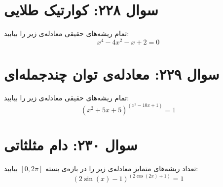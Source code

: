 \documentclass[12pt]{article}
\begin{document}
\vspace{1cm}
\hrulefill
\vspace{1cm}

\section*{سوال ۲۲۸: کوارتیک طلایی}
تمام ریشه‌های حقیقی معادله‌ی زیر را بیابید:
\begin{displaymath}
	x^4 - 4x^2 - x + 2 = 0
\end{displaymath}

\vspace{1cm}
\hrulefill
\vspace{1cm}

\section*{سوال ۲۲۹: معادله‌ی توان چندجمله‌ای}
تمام ریشه‌های حقیقی معادله‌ی زیر را بیابید:
\begin{displaymath}
	(x^2+5x+5)^{(x^2-10x+1)} = 1
\end{displaymath}

\vspace{1cm}
\hrulefill
\vspace{1cm}

\section*{سوال ۲۳۰: دام مثلثاتی}
تعداد ریشه‌های متمایز معادله‌ی زیر را در بازه‌ی بسته \( [0, 2\pi] \) بیابید:
\begin{displaymath}
	(2\sin(x) - 1)^{(2\cos(2x) + 1)} = 1
\end{displaymath}

\vspace{1cm}
\hrulefill
\vspace{1cm}

\end{document}
